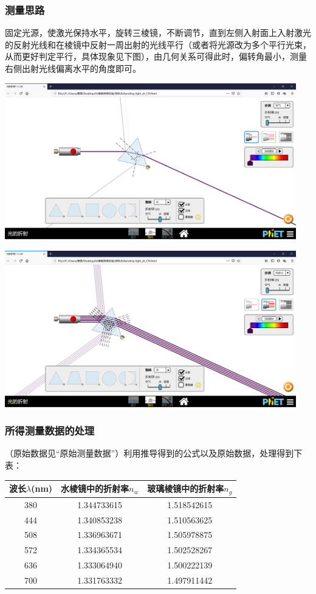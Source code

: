 \documentclass[UTF8]{ctexart}
\begin{document}
\subsubsection{测量思路}
固定光源，使激光保持水平，旋转三棱镜，不断调节，直到左侧入射面上入射激光的反射光线和在棱镜中反射一周出射的光线平行（或者将光源改为多个平行光束，从而更好判定平行，具体现象见下图），由几何关系可得此时，偏转角最小，测量右侧出射光线偏离水平的角度即可。
\begin{center} 
\includegraphics[width=0.95\textwidth]{A.png} 
\end{center}
\begin{center} 
\includegraphics[width=0.95\textwidth]{B.png} 
\end{center}
\subsubsection{所得测量数据的处理}
（原始数据见“原始测量数据”）利用推导得到的公式以及原始数据，处理得到下表：
\begin{table}[h] 
\centering 
\begin{tabular}{|c|c|c|} 
\hline 
波长$\lambda$(nm) &  水棱镜中的折射率$n_w$ &玻璃棱镜中的折射率$n_g$ \\ 
\hline 
380 & 1.344733615 &1.518542615\\ 
\hline 
444 & 1.340853238 &1.510563625\\ 
\hline 
508 & 1.336963671  &1.505978875\\ 
\hline 
572 & 1.334365534  &1.502528267\\ 
\hline 
636 & 1.333064940 &1.500222139\\ 
\hline 
700 & 1.331763332 &1.497911442 \\ 
\hline
\end{tabular} 
\end{table}
\end{document}
